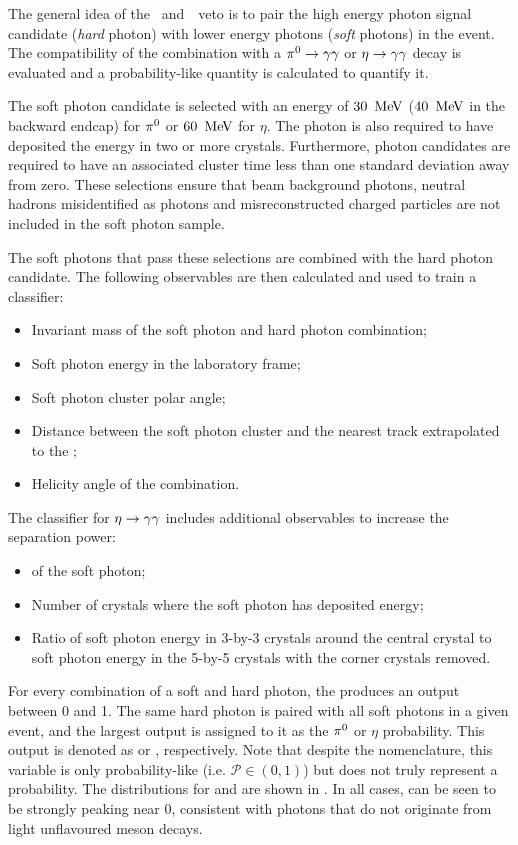 The general idea of the \piz~and~\eta~veto is to pair the high energy photon signal candidate (\textit{hard} photon) with lower energy photons (\textit{soft} photons) in the event.
The compatibility of the combination with a $\pi^0\rightarrow\gamma\gamma$ or $\eta\rightarrow\gamma\gamma$ decay is evaluated and a probability-like quantity is calculated to quantify it.

The soft photon candidate is selected with an energy of $30~\mathrm{\,Me\kern -0.1em V}$ ($40~\mathrm{\,Me\kern -0.1em V}$ in the backward \ECL endcap) for $\pi^0$ or $60~\mathrm{\,Me\kern -0.1em V}$ for $\eta$.
The photon is also required to have deposited the energy in two or more crystals.
Furthermore, photon candidates are required to have an associated cluster time less than one standard deviation away from zero.
These selections ensure that beam background photons, neutral hadrons misidentified as photons and misreconstructed charged particles are not included in the soft photon sample.

The soft photons that pass these selections are combined with the hard photon candidate.
The following observables are then calculated and used to train a \MVA classifier:
\begin{itemize}
    \item Invariant mass of the soft photon and hard photon combination;
    \item Soft photon energy in the laboratory frame;
    \item Soft photon \ECL cluster polar angle;
    \item Distance between the soft photon \ECL cluster and the nearest track extrapolated to the \ECL;
    \item Helicity angle of the combination.
\end{itemize}
The classifier for $\eta\rightarrow\gamma\gamma$ includes additional observables to increase the separation power:
\begin{itemize}
    \item \ZMVA of the soft photon;
    \item Number of crystals where the soft photon has deposited energy;
    \item Ratio of soft photon energy in 3-by-3 crystals around the central crystal to soft photon energy in the 5-by-5 crystals with the corner crystals removed.
\end{itemize}
For every combination of a soft and hard photon, the \MVA produces an output between 0 and 1.
The same hard photon is paired with all soft photons in a given event, and the largest \MVA output is assigned to it as the $\pi^0$ or $\eta$ probability.
This \MVA output is denoted as \piVeto or \etaVeto, respectively.
Note that despite the nomenclature, this variable is only probability-like (i.e. $\mathcal{P}\in(0,1)$) but does not truly represent a probability.
The distributions for \piVeto and \etaVeto are shown in .
In all cases, \BtoXsgamma can be seen to be strongly peaking near 0, consistent with photons that do not originate from light unflavoured meson decays.

